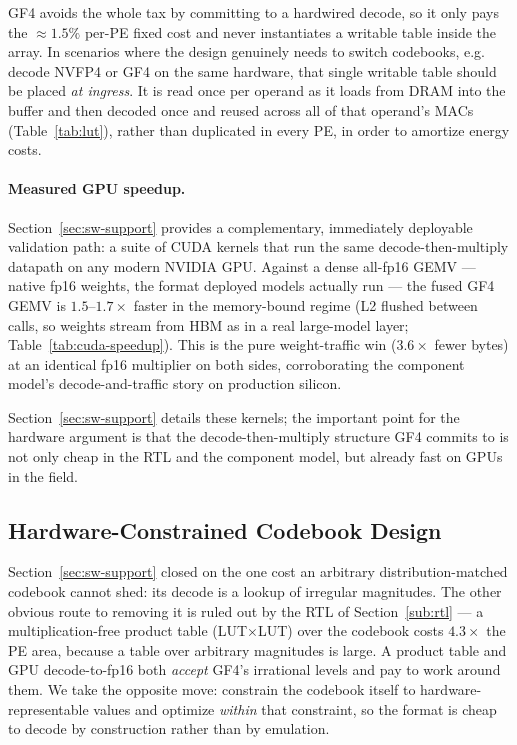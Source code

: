 GF4 avoids the whole tax by committing to a hardwired decode, so it only pays the
$\approx$$1.5\%$ per-PE fixed cost and never instantiates a writable table inside
the array. In scenarios where the design genuinely needs to switch codebooks,
e.g. decode NVFP4 or GF4 on the same hardware, that single writable table should
be placed \emph{at ingress}. It is read once per operand as it loads from DRAM
into the buffer and then decoded once and reused across all of that operand's
MACs (Table~\ref{tab:lut}), rather than duplicated in every PE, in order to
amortize energy costs.

\paragraph{Measured GPU speedup.} Section~\ref{sec:sw-support} provides a
complementary, immediately deployable validation path: a suite of CUDA kernels
that run the same decode-then-multiply datapath on any modern NVIDIA GPU. Against
a dense all-fp16 GEMV --- native fp16 weights, the format deployed models
actually run --- the fused GF4 GEMV is $1.5$--$1.7\times$ faster in the
memory-bound regime (L2 flushed between calls, so weights stream from HBM as in a
real large-model layer; Table~\ref{tab:cuda-speedup}). This is the pure
weight-traffic win ($3.6\times$ fewer bytes) at an identical fp16 multiplier on
both sides, corroborating the component model's decode-and-traffic story on
production silicon.

Section~\ref{sec:sw-support} details these kernels; the important point for the
hardware argument is that the decode-then-multiply structure GF4 commits to is
not only cheap in the RTL and the component model, but already fast on GPUs in
the field.


\subsection{Hardware-Constrained Codebook Design}\label{subsec:codebook-design}

Section~\ref{sec:sw-support} closed on the one cost an arbitrary
distribution-matched codebook cannot shed: its decode is a lookup of irregular
magnitudes. The other obvious route to removing it is ruled out by the RTL of
Section~\ref{sub:rtl} --- a multiplication-free product table (LUT$\times$LUT) over
the codebook costs $4.3\times$ the PE area, because a table over arbitrary
magnitudes is large. A product table and GPU decode-to-fp16 both \emph{accept}
GF4's irrational levels and pay to work around them. We take the opposite move:
constrain the codebook itself to hardware-representable values and optimize
\emph{within} that constraint, so the format is cheap to decode by construction
rather than by emulation.

